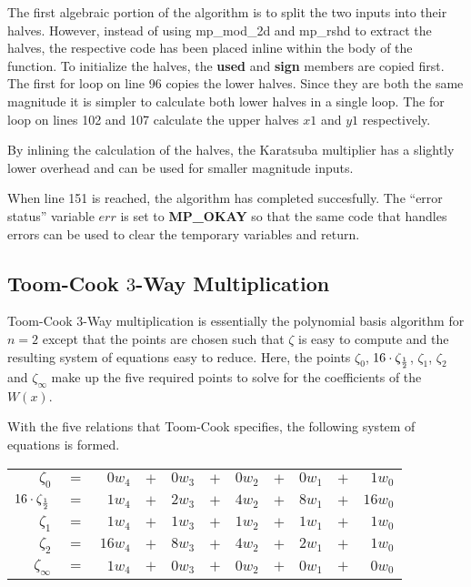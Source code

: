 \documentclass[b5paper]{book}
\begin{document}
The first algebraic portion of the algorithm is to split the two inputs into their halves.  However, instead of using mp\_mod\_2d and mp\_rshd
to extract the halves, the respective code has been placed inline within the body of the function.  To initialize the halves, the \textbf{used} and 
\textbf{sign} members are copied first.  The first for loop on line 96 copies the lower halves.  Since they are both the same magnitude it 
is simpler to calculate both lower halves in a single loop.  The for loop on lines 102 and 107 calculate the upper halves $x1$ and 
$y1$ respectively.

By inlining the calculation of the halves, the Karatsuba multiplier has a slightly lower overhead and can be used for smaller magnitude inputs.

When line 151 is reached, the algorithm has completed succesfully.  The ``error status'' variable $err$ is set to \textbf{MP\_OKAY} so that
the same code that handles errors can be used to clear the temporary variables and return.  

\subsection{Toom-Cook $3$-Way Multiplication}
Toom-Cook $3$-Way \cite{TOOM} multiplication is essentially the polynomial basis algorithm for $n = 2$ except that the points  are 
chosen such that $\zeta$ is easy to compute and the resulting system of equations easy to reduce.  Here, the points $\zeta_{0}$, 
$16 \cdot \zeta_{1 \over 2}$, $\zeta_1$, $\zeta_2$ and $\zeta_{\infty}$ make up the five required points to solve for the coefficients 
of the $W(x)$.

With the five relations that Toom-Cook specifies, the following system of equations is formed.

\begin{center}
\begin{tabular}{rcrcrcrcrcr}
$\zeta_0$                    & $=$ & $0w_4$ & $+$ & $0w_3$ & $+$ & $0w_2$ & $+$ & $0w_1$ & $+$ & $1w_0$  \\
$16 \cdot \zeta_{1 \over 2}$ & $=$ & $1w_4$ & $+$ & $2w_3$ & $+$ & $4w_2$ & $+$ & $8w_1$ & $+$ & $16w_0$  \\
$\zeta_1$                    & $=$ & $1w_4$ & $+$ & $1w_3$ & $+$ & $1w_2$ & $+$ & $1w_1$ & $+$ & $1w_0$  \\
$\zeta_2$                    & $=$ & $16w_4$ & $+$ & $8w_3$ & $+$ & $4w_2$ & $+$ & $2w_1$ & $+$ & $1w_0$  \\
$\zeta_{\infty}$             & $=$ & $1w_4$ & $+$ & $0w_3$ & $+$ & $0w_2$ & $+$ & $0w_1$ & $+$ & $0w_0$  \\
\end{tabular}
\end{center}
\end{document}

